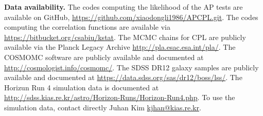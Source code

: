 \documentclass{natureprintstyle}
\begin{document}
\noindent
{\textbf{Data availability.}} 
The codes computing the likelihood of the AP tests are available on GitHub,
\href{https://github.com/xiaodongli1986/APCPL.git}
{https://github.com/xiaodongli1986/APCPL.git}.
The codes computing the correlation functions are available via
\href{https://bitbucket.org/csabiu/kstat}
{https://bitbucket.org/csabiu/kstat}.
The MCMC chains for CPL are publicly available via the Planck Legacy Archive
\href{http://pla.esac.esa.int/pla/}
{http://pla.esac.esa.int/pla/}.
The COSMOMC software are publicly available and documented at
\href{http://cosmologist.info/cosmomc/}
{http://cosmologist.info/cosmomc/}.
The SDSS DR12 galaxy samples are publicly available and documented at
\href{https://data.sdss.org/sas/dr12/boss/lss/}
{https://data.sdss.org/sas/dr12/boss/lss/}.
The Horizun Run 4 simulation data is documented at
\href{http://sdss.kias.re.kr/astro/Horizon-Runs/Horizon-Run4.php}
{http://sdss.kias.re.kr/astro/Horizon-Runs/Horizon-Run4.php}.
To use the simulation data, contact directly Juhan Kim \href{kjhan@kias.re.kr}{kjhan@kias.re.kr}.




%
\end{document}
